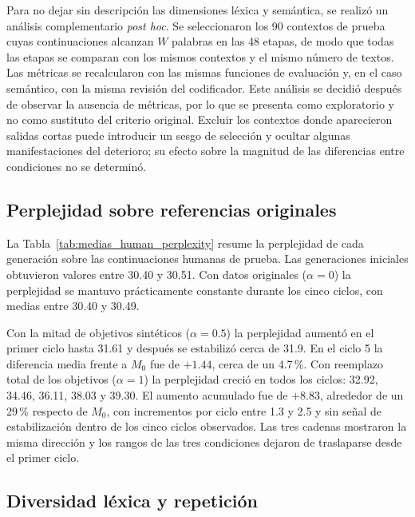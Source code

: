 \documentclass[12pt,letterpaper]{article}
\begin{document}
Para no dejar sin descripción las dimensiones léxica y semántica, se realizó
un análisis complementario \textit{post hoc}. Se seleccionaron los 90
contextos de prueba cuyas continuaciones alcanzan \(W\) palabras en las 48
etapas, de modo que todas las etapas se comparan con los mismos contextos y
el mismo número de textos. Las métricas se recalcularon con las mismas
funciones de evaluación y, en el caso semántico, con la misma revisión del
codificador. Este análisis se decidió después de observar la ausencia de
métricas, por lo que se presenta como exploratorio y no como sustituto del
criterio original. Excluir los contextos donde aparecieron salidas cortas
puede introducir un sesgo de selección y ocultar algunas manifestaciones
del deterioro; su efecto sobre la magnitud de las diferencias entre
condiciones no se determinó.

\subsection{Perplejidad sobre referencias originales}

La Tabla~\ref{tab:medias_human_perplexity} resume la perplejidad de cada
generación sobre las continuaciones humanas de prueba. Las generaciones
iniciales obtuvieron valores entre 30.40 y 30.51. Con datos originales
(\(\alpha=0\)) la perplejidad se mantuvo prácticamente constante durante
los cinco ciclos, con medias entre 30.40 y 30.49.



Con la mitad de objetivos sintéticos (\(\alpha=0.5\)) la perplejidad
aumentó en el primer ciclo hasta 31.61 y después se estabilizó cerca de 31.9.
En el ciclo 5 la diferencia media frente a \(M_0\) fue de \(+1.44\), cerca de
un 4.7\,\%. Con reemplazo total de los objetivos (\(\alpha=1\)) la
perplejidad creció en todos los ciclos: 32.92, 34.46, 36.11, 38.03 y 39.30.
El aumento acumulado fue de \(+8.83\), alrededor de un 29\,\% respecto de
\(M_0\), con incrementos por ciclo entre 1.3 y 2.5 y sin señal de
estabilización dentro de los cinco ciclos observados. Las tres cadenas
mostraron la misma dirección y los rangos de las tres condiciones dejaron
de traslaparse desde el primer ciclo.

\subsection{Diversidad léxica y repetición}
\end{document}
